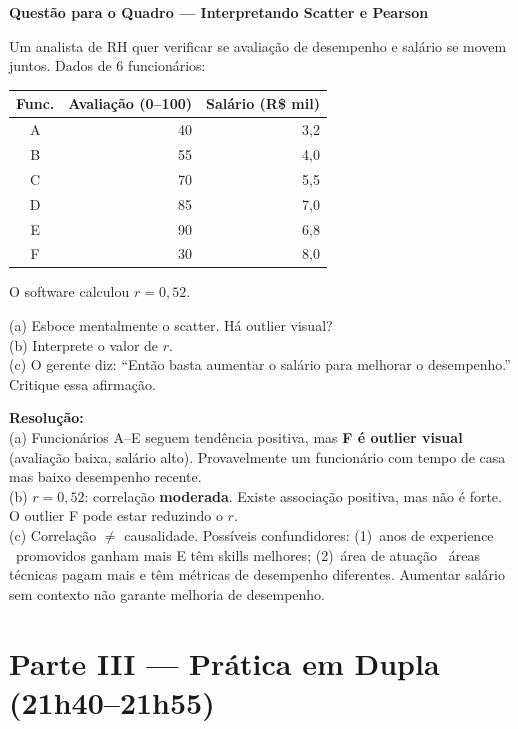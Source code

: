 \begin{SolvedBox}
\textbf{Questão para o Quadro — Interpretando Scatter e Pearson}

Um analista de RH quer verificar se avaliação de desempenho e
salário se movem juntos. Dados de 6 funcionários:

\begin{center}
\begin{tabular}{|c|r|r|}
\hline
\textbf{Func.} & \textbf{Avaliação (0–100)} & \textbf{Salário (R\$ mil)} \\
\hline
A & 40 & 3{,}2 \\
B & 55 & 4{,}0 \\
C & 70 & 5{,}5 \\
D & 85 & 7{,}0 \\
E & 90 & 6{,}8 \\
F & 30 & 8{,}0 \\
\hline
\end{tabular}
\end{center}

O software calculou $r = 0{,}52$.

(a) Esboce mentalmente o scatter. Há outlier visual?\\
(b) Interprete o valor de $r$.\\
(c) O gerente diz: ``Então basta aumentar o salário para melhorar o
desempenho.'' Critique essa afirmação.

\textbf{Resolução:}\\
(a) Funcionários A--E seguem tendência positiva, mas \textbf{F é outlier
visual} (avaliação baixa, salário alto). Provavelmente um funcionário
com tempo de casa mas baixo desempenho recente.\\
(b) $r = 0{,}52$: correlação \textbf{moderada}. Existe associação positiva,
mas não é forte. O outlier F pode estar reduzindo o $r$.\\
(c) Correlação $\neq$ causalidade. Possíveis confundidores: (1)~anos de
experience \textrightarrow\ promovidos ganham mais E têm skills melhores;
(2)~área de atuação \textrightarrow\ áreas técnicas pagam mais e têm
métricas de desempenho diferentes. Aumentar salário sem contexto não
garante melhoria de desempenho.
\end{SolvedBox}

\section{Parte III — Prática em Dupla (21h40–21h55)}

